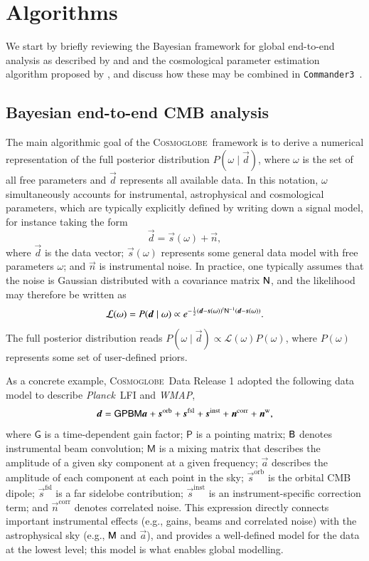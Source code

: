 \documentclass[twocolumn]{../common/aa}
\def\WMAP{\emph{WMAP}}
\def\Planck{\emph{Planck}}
\def\commanderthree{\texttt{Commander3}}
\renewcommand{\d}[0]{\vec{d}}
\newcommand{\B}[0]{\tens{B}}
\renewcommand{\G}[0]{\tens{G}}
\newcommand{\n}[0]{\vec{n}}
\newcommand{\s}[0]{\vec{s}}
\renewcommand{\a}[0]{\vec{a}}
\newcommand{\N}[0]{\tens{N}}
\newcommand{\M}[0]{\tens{M}}
\renewcommand{\P}[0]{\tens{P}}
\newcommand{\cosmoglobe}{\textsc{Cosmoglobe}}
\begin{document}
\section{Algorithms}
\label{sec:methods}

We start by briefly reviewing the Bayesian framework for global end-to-end analysis as described by \citet{bp01} and \citet{watts2023_dr1} and the cosmological parameter estimation algorithm proposed by \citet{racine:2016}, and discuss how these may be combined in \commanderthree\ \citep{bp03}.

\subsection{Bayesian end-to-end CMB analysis}

The main algorithmic goal of the \cosmoglobe\ framework is to derive a numerical representation of the full posterior distribution $P(\omega\mid\d)$, where $\omega$ is the set of all free parameters and $\d$ represents all available data. In this notation, $\omega$ simultaneously accounts for instrumental, astrophysical and cosmological parameters, which are typically explicitly defined by writing down a signal model, for instance taking the form
\begin{equation}
    \label{eq:data_model}
    \d = \s(\omega) + \n,
\end{equation}
where $\d$ is the data vector; $\s(\omega)$ represents some general data model with free parameters $\omega$; and $\n$ is instrumental noise. In practice, one typically assumes that the noise is Gaussian distributed with a covariance matrix $\N$, and the likelihood may therefore be written as
\begin{equation}
  \mathcal{L}(\omega) = P(\d\mid\omega) \propto e^{-\frac{1}{2}\left(\d-\s(\omega)\right)^t\N^{-1}\left(\d-\s(\omega)\right)}.
\end{equation}
The full posterior distribution reads $P(\omega\mid\d) \propto \mathcal{L}(\omega)P(\omega)$, where $P(\omega)$ represents some set of user-defined priors.

As a concrete example, \cosmoglobe\ Data Release 1 \citep{watts2023_dr1} adopted the following data model to describe \Planck\ LFI and \WMAP,
\begin{equation}
	\label{eq:model}
	\d =\G\P\B\M\a+ \s^\mathrm{orb}
	+\s^\mathrm{fsl} + \s^\mathrm{inst}+ \n^\mathrm{corr}+\n^\mathrm w,
\end{equation}
where $\mathsf G$ is a time-dependent gain factor; $\mathsf P$ is a pointing matrix;
$\B$ denotes instrumental beam convolution; $\mathsf M$ is a mixing matrix that describes the amplitude of a given sky component at a given frequency; $\a$ describes the amplitude of each component at each point in the sky; $\s^\mathrm{orb}$ is the orbital CMB dipole; $\s^\mathrm{fsl}$ is a far sidelobe contribution; $\s^\mathrm{inst}$ is an instrument-specific correction term; and $\n^\mathrm{corr}$ denotes correlated noise. This expression directly connects important instrumental effects (e.g., gains, beams and correlated noise) with the astrophysical sky (e.g., $\M$ and $\a$), and provides a well-defined model for the data at the lowest level; this model is what enables global modelling.
\end{document}
